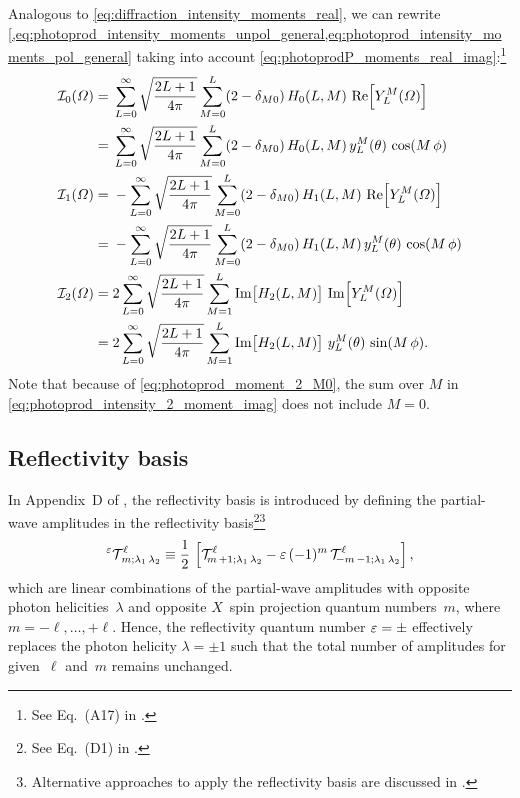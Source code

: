Analogous to \cref{eq:diffraction_intensity_moments_real}, we can
rewrite
\cref{,eq:photoprod_intensity_moments_unpol_general,eq:photoprod_intensity_moments_pol_general}
taking into account
\cref{eq:photoprodP_moments_real_imag}:\footnote{See Eq.~(A17) in
.}
\begin{align}
  \mathcal{I}_0(\Omega)
  ={}& \sum_{L = 0}^\infty \sqrt{\frac{2 L + 1}{4 \pi}} \sum_{M = 0}^{L} (2 - \delta_{M 0})\, H_0(L, M)\, \Re{Y_L^M(\Omega)} \notag
  \\
  \label{eq:photoprod_intensity_0_moment_real}
  ={}& \sum_{L = 0}^\infty \sqrt{\frac{2 L + 1}{4 \pi}} \sum_{M = 0}^{L} (2 - \delta_{M 0})\, H_0(L, M)\, y_L^M(\theta)\, \cos(M\, \phi)
  \\
  \mathcal{I}_1(\Omega)
  ={}& -\sum_{L = 0}^\infty \sqrt{\frac{2 L + 1}{4 \pi}} \sum_{M = 0}^{L} (2 - \delta_{M 0})\, H_1(L, M)\, \Re{Y_L^M(\Omega)} \notag
  \\
  \label{eq:photoprod_intensity_1_moment_real}
  ={}& -\sum_{L = 0}^\infty \sqrt{\frac{2 L + 1}{4 \pi}} \sum_{M = 0}^{L} (2 - \delta_{M 0})\, H_1(L, M)\, y_L^M(\theta)\, \cos(M\, \phi)
  \\
  \mathcal{I}_2(\Omega)
  ={}& 2 \sum_{L = 0}^\infty \sqrt{\frac{2 L + 1}{4 \pi}} \sum_{M = 1}^{L} \Im{H_2(L, M)}\, \Im{Y_L^M(\Omega)} \notag
  \\
  \label{eq:photoprod_intensity_2_moment_imag}
  ={}& 2 \sum_{L = 0}^\infty \sqrt{\frac{2 L + 1}{4 \pi}} \sum_{M = 1}^{L} \Im{H_2(L, M)}\, y_L^M(\theta)\, \sin(M\, \phi).
\end{align}
Note that because of \cref{eq:photoprod_moment_2_M0}, the sum over $M$
in \cref{eq:photoprod_intensity_2_moment_imag} does not include $M =
0$.


\subsection{Reflectivity basis}%
\label{sec:photoprod:reflectivity}

In Appendix~D of , the reflectivity basis is
introduced by defining the partial-wave amplitudes in the reflectivity
basis\footnote{See Eq.~(D1) in
.}\footnote{Alternative approaches to apply
the reflectivity basis are discussed in .}
\begin{equation}
  \label{eq:photoprod_amplitude_refl}
  \prescript{\refl}{}{\mathcal{T}}^\ell_{\!m; \lambda_1\, \lambda_2}
  \equiv \frac{1}{2}\, \sBrk{\mathcal{T}^\ell_{\!m\, {+1}; \lambda_1\, \lambda_2}
  - \refl\, (-1)^m\, \mathcal{T}^\ell_{\!{-m}\, {-1}; \lambda_1\, \lambda_2}},
\end{equation}
which are linear combinations of the partial-wave amplitudes with
opposite photon helicities~$\lambda$ and opposite $X$~spin projection
quantum numbers~$m$, where $m = -\ell, \ldots, +\ell$.  Hence, the
reflectivity quantum number $\varepsilon = \pm$ effectively replaces the
photon helicity $\lambda = \pm 1$ such that the total number of
amplitudes for given~$\ell$ and~$m$ remains unchanged.

